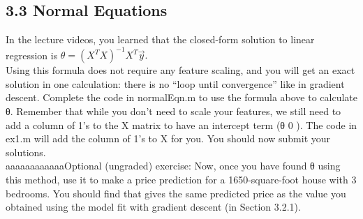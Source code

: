 \documentclass[11pt]{article}
\begin{document}
    \subsection{3.3 Normal Equations}\label{normal-equations}

In the lecture videos, you learned that the closed-form solution to
linear regression is \(\theta = (X^TX)^{-1}X^T\vec{y}.\)\\
Using this formula does not require any feature scaling, and you will
get an exact solution in one calculation: there is no ``loop until
convergence'' like in gradient descent. Complete the code in normalEqn.m
to use the formula above to calculate θ. Remember that while you don't
need to scale your features, we still need to add a column of 1's to the
X matrix to have an intercept term (θ 0 ). The code in ex1.m will add
the column of 1's to X for you. You should now submit your solutions.\\
aaaaaaaaaaaaOptional (ungraded) exercise: Now, once you have found θ
using this method, use it to make a price prediction for a
1650-square-foot house with 3 bedrooms. You should find that gives the
same predicted price as the value you obtained using the model fit with
gradient descent (in Section 3.2.1).
\end{document}

